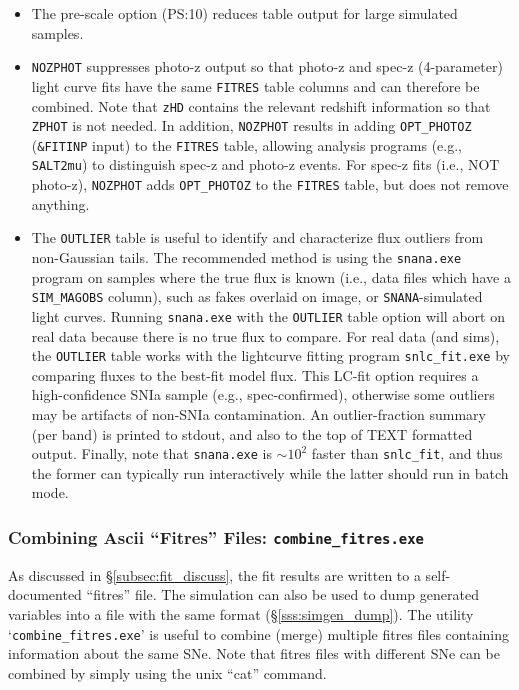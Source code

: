 \documentclass[12pt]{article}
\newcommand{\SNANA}{{\tt SNANA}}
\begin{document}
{\begin{itemize}
(flux vs. wavelength).
The {\tt MODELSPEC} table may be useful for calibration 
corrections that require an SED. To save storage, each spectrum 
is stored within the wavelength range defined by the passband.
%
\item
The pre-scale option (PS:10) reduces table output for large
simulated samples.
%
\item
{\tt NOZPHOT} suppresses photo-z output so that photo-z and spec-z 
(4-parameter) light curve fits have the same {\tt FITRES} table columns 
and can therefore be combined. Note that {\tt zHD} contains the 
relevant redshift information so that {\tt ZPHOT} is not needed. 
In addition, {\tt NOZPHOT} results in adding {\tt OPT\_PHOTOZ} 
({\tt \&FITINP} input) to the {\tt FITRES} table,
allowing analysis programs (e.g., {\tt SALT2mu})
to distinguish spec-z and photo-z events.
For spec-z fits (i.e., NOT photo-z),  
{\tt NOZPHOT} adds {\tt OPT\_PHOTOZ} to the {\tt FITRES} table,
but does not remove anything.
%
\item The {\tt OUTLIER} table is useful to identify and characterize
flux outliers from non-Gaussian tails. The recommended method is using
the {\tt snana.exe} program on samples where the true flux is known
(i.e., data files which have a {\tt SIM\_MAGOBS} column), 
such as fakes overlaid on image, or {\SNANA}-simulated light curves. 
Running {\tt snana.exe} with the {\tt OUTLIER} table option will 
abort on real data because there is no true flux to compare.
For real data (and sims), the {\tt OUTLIER} table works with the
lightcurve fitting program {\tt snlc\_fit.exe} by comparing fluxes to 
the best-fit model flux. This LC-fit option requires a high-confidence 
SNIa sample (e.g., spec-confirmed),
otherwise some outliers may be artifacts of non-SNIa contamination.
An outlier-fraction summary (per band) is printed to stdout,
and also to the top of TEXT formatted output.
Finally, note that {\tt snana.exe} is $\sim 10^2$ faster than {\tt snlc\_fit},
and thus the former can typically run interactively while the latter
should run in batch mode.
\end{itemize}

  \subsubsection{Combining Ascii ``Fitres'' Files: {\tt combine\_fitres.exe}}
  \label{sss:combine_fitres}

As discussed in \S\ref{subsec:fit_discuss},
the fit results are written to a self-documented
``fitres'' file.  The simulation can also be
used to dump generated variables into a file
with the same format (\S\ref{sss:simgen_dump}).
The utility `{\tt combine\_fitres.exe}' is useful to
combine (merge) multiple fitres files containing
information about the same SNe.  Note that fitres
files with different SNe can be combined by simply
using the unix ``cat'' command.

}
\end{document}
